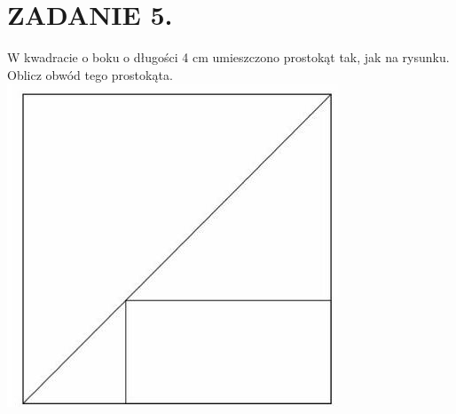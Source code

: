 \documentclass[10pt]{article}
\begin{document}
\section*{ZADANIE 5.}
W kwadracie o boku o długości 4 cm umieszczono prostokąt tak, jak na rysunku. Oblicz obwód tego prostokąta.\\
\includegraphics[max width=\textwidth, center]{2024_11_21_823cc8b405444b8ad8bfg-1(1)}
\end{document}
